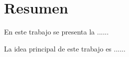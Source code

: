 \chapter*{Resumen}
En este trabajo se presenta la ......

La idea principal de este trabajo es ......
